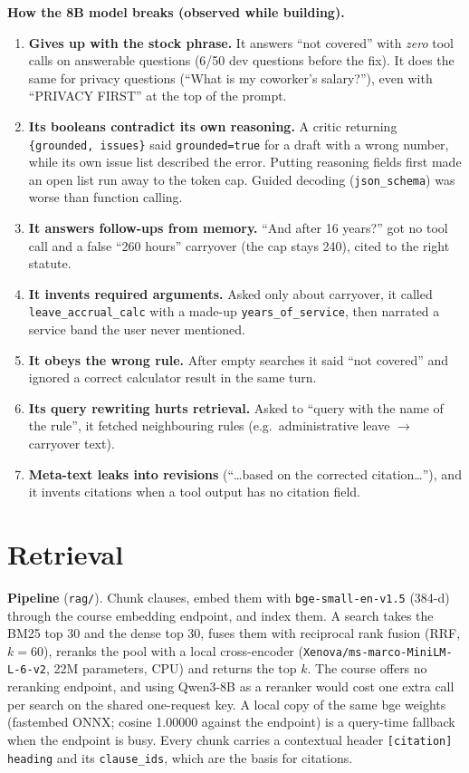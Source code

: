 \documentclass[11pt,a4paper]{article}
\begin{document}
\textbf{How the 8B model breaks (observed while building).}
\begin{enumerate}
\item \textbf{Gives up with the stock phrase.} It answers ``not covered'' with \emph{zero} tool calls on answerable
questions (6/50 dev questions before the fix). It does the same for privacy questions (``What is my coworker's
salary?''), even with ``PRIVACY FIRST'' at the top of the prompt.
\item \textbf{Its booleans contradict its own reasoning.} A critic returning \texttt{\{grounded, issues\}} said
\texttt{grounded=true} for a draft with a wrong number, while its own issue list described the error. Putting
reasoning fields first made an open list run away to the token cap. Guided decoding (\texttt{json\_schema}) was
worse than function calling.
\item \textbf{It answers follow-ups from memory.} ``And after 16 years?'' got no tool call and a false
``260 hours'' carryover (the cap stays 240), cited to the right statute.
\item \textbf{It invents required arguments.} Asked only about carryover, it called \texttt{leave\_accrual\_calc}
with a made-up \texttt{years\_of\_service}, then narrated a service band the user never mentioned.
\item \textbf{It obeys the wrong rule.} After empty searches it said ``not covered'' and ignored a correct
calculator result in the same turn.
\item \textbf{Its query rewriting hurts retrieval.} Asked to ``query with the name of the rule'', it fetched
neighbouring rules (e.g.\ administrative leave $\to$ carryover text).
\item \textbf{Meta-text leaks into revisions} (``\ldots based on the corrected citation\ldots''), and it invents
citations when a tool output has no citation field.
\end{enumerate}

\section{Retrieval}
\label{sec:rag}
\textbf{Pipeline} (\texttt{rag/}). Chunk clauses, embed them with \texttt{bge-small-en-v1.5} (384-d) through the
course embedding endpoint, and index them. A search takes the BM25 top 30 and the dense top 30, fuses them with
reciprocal rank fusion (RRF, $k{=}60$), reranks the pool with a local cross-encoder
(\texttt{Xenova/ms-marco-MiniLM-L-6-v2}, 22M parameters, CPU) and returns the top $k$. The course offers no
reranking endpoint, and using Qwen3-8B as a reranker would cost one extra call per search on the shared
one-request key. A local copy of the same bge weights (fastembed ONNX; cosine 1.00000 against the endpoint) is a
query-time fallback when the endpoint is busy. Every chunk carries a contextual header \texttt{[citation] heading}
and its \texttt{clause\_ids}, which are the basis for citations.
\end{document}

